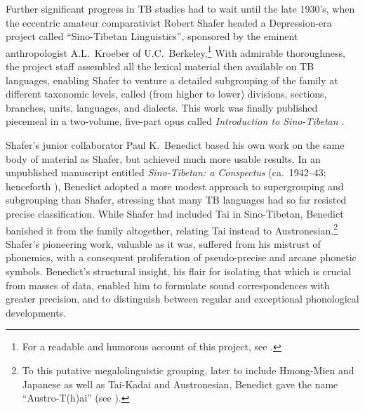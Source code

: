 Further significant progress in TB studies had to wait until the late 1930’s, when the eccentric amateur comparativist Robert Shafer headed a Depression-era project called “Sino-Tibetan Linguistics”, sponsored by the eminent anthropologist A.L.\ Kroeber of U.C.\ Berkeley.\footnote{For a readable and humorous account of this project, see \citealt{PKB-WIAB}.} With admirable thoroughness, the project staff assembled all the lexical material then available on TB languages, enabling Shafer to venture a detailed subgrouping of the family at different taxonomic levels, called (from higher to lower) divisions, sections, branches, units, languages, and dialects. This work was finally published piecemeal in a two-volume, five-part opus called \textit{Introduction to Sino-Tibetan} \citeyearpar{SHA1966-73}.

Shafer’s junior collaborator Paul K.\ Benedict based his own work on the same body of material as Shafer, but achieved much more usable results. In an unpublished manuscript entitled \textit{Sino-Tibetan: a Conspectus} (ca.\ 1942–43; henceforth \textit{}), Benedict adopted a more modest approach to supergrouping and subgrouping than Shafer, stressing that many TB languages had so far resisted precise classification. While Shafer had included Tai in Sino-Tibetan, Benedict \citeyearpar{PKB-TKI} banished it from the family altogether, relating Tai instead to Austronesian.\footnote{To this putative megalolinguistic grouping, later to include Hmong-Mien and Japanese as well as Tai-Kadai and Austronesian, Benedict gave the name “Austro-T(h)ai” (see \citealt{PKB-ATLC,PKB-ATJ}).} Shafer’s pioneering work, valuable as it was, suffered from his mistrust of phonemics, with a consequent proliferation of pseudo-precise and arcane phonetic symbols. Benedict’s structural insight, his flair for isolating that which is crucial from masses of data, enabled him to formulate sound correspondences with greater precision, and to distinguish between regular and exceptional phonological developments.

